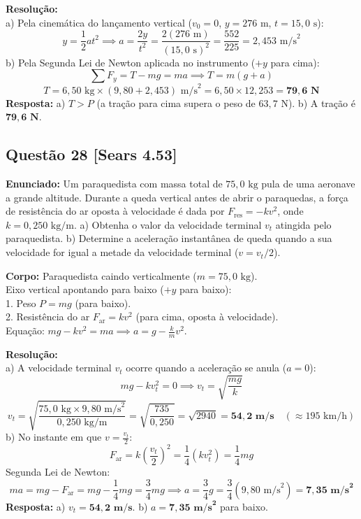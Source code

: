 \documentclass[11pt,a4paper]{article}
\begin{document}
\noindent
\textbf{Resolução:}\\
a) Pela cinemática do lançamento vertical ($v_0 = 0$, $y = 276\text{ m}$, $t = 15,0\text{ s}$):
\[ y = \frac{1}{2} a t^2 \implies a = \frac{2y}{t^2} = \frac{2(276\text{ m})}{(15,0\text{ s})^2} = \frac{552}{225} = 2,453\text{ m/s}^2 \]
b) Pela Segunda Lei de Newton aplicada no instrumento ($+y$ para cima):
\[ \sum F_y = T - mg = m a \implies T = m(g + a) \]
\[ T = 6,50\text{ kg} \times (9,80 + 2,453)\text{ m/s}^2 = 6,50 \times 12,253 = \mathbf{79,6\text{ N}} \]
\textbf{Resposta:} a) $T > P$ (a tração para cima supera o peso de $63,7\text{ N}$). b) A tração é $\mathbf{79,6\text{ N}}$.

\vspace{0.3cm}
\subsection*{Questão 28 [Sears 4.53]}
\textbf{Enunciado:} Um paraquedista com massa total de $75,0\text{ kg}$ pula de uma aeronave a grande altitude. Durante a queda vertical antes de abrir o paraquedas, a força de resistência do ar oposta à velocidade é dada por $F_{\text{res}} = -k v^2$, onde $k = 0,250\text{ kg/m}$. a) Obtenha o valor da velocidade terminal $v_t$ atingida pelo paraquedista. b) Determine a aceleração instantânea de queda quando a sua velocidade for igual a metade da velocidade terminal ($v = v_t / 2$).

\begin{dclbox}
\textbf{Corpo:} Paraquedista caindo verticalmente ($m = 75,0\text{ kg}$).\\
Eixo vertical apontando para baixo ($+y$ para baixo):\\
1. Peso $P = mg$ (para baixo).\\
2. Resistência do ar $F_{\text{ar}} = k v^2$ (para cima, oposta à velocidade).\\
Equação: $mg - k v^2 = m a \implies a = g - \frac{k}{m}v^2$.
\end{dclbox}

\noindent
\textbf{Resolução:}\\
a) A velocidade terminal $v_t$ ocorre quando a aceleração se anula ($a = 0$):
\[ mg - k v_t^2 = 0 \implies v_t = \sqrt{\frac{mg}{k}} \]
\[ v_t = \sqrt{\frac{75,0\text{ kg} \times 9,80\text{ m/s}^2}{0,250\text{ kg/m}}} = \sqrt{\frac{735}{0,250}} = \sqrt{2940} = \mathbf{54,2\text{ m/s}} \quad (\approx 195\text{ km/h}) \]
b) No instante em que $v = \frac{v_t}{2}$:
\[ F_{\text{ar}} = k \left(\frac{v_t}{2}\right)^2 = \frac{1}{4} (k v_t^2) = \frac{1}{4} mg \]
Segunda Lei de Newton:
\[ m a = mg - F_{\text{ar}} = mg - \frac{1}{4} mg = \frac{3}{4} mg \implies a = \frac{3}{4} g = \frac{3}{4}(9,80\text{ m/s}^2) = \mathbf{7,35\text{ m/s}^2} \]
\textbf{Resposta:} a) $v_t = \mathbf{54,2\text{ m/s}}$. b) $a = \mathbf{7,35\text{ m/s}^2}$ para baixo.
\end{document}
